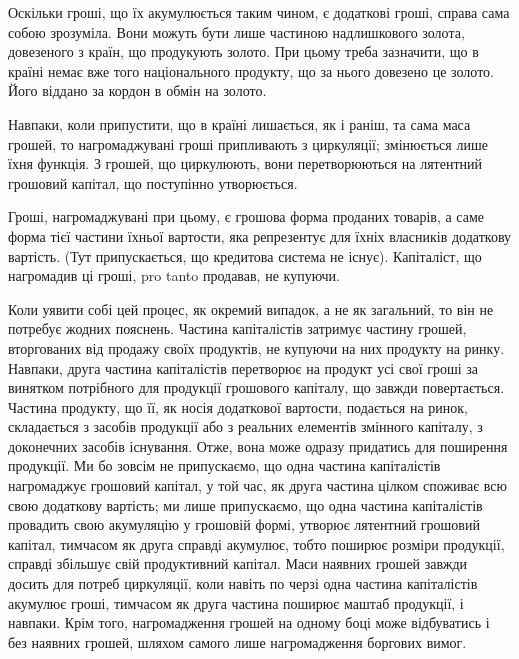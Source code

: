 Оскільки гроші, що їх акумулюється таким чином, є додаткові гроші,
справа сама собою зрозуміла. Вони можуть бути лише частиною надлишкового
золота, довезеного з країн, що продукують золото. При цьому
треба зазначити, що в країні немає вже того національного продукту,
що за нього довезено це золото. Його віддано за кордон в обмін на
золото.

Навпаки, коли припустити, що в країні лишається, як і раніш, та сама
маса грошей, то нагромаджувані гроші припливають з циркуляції; змінюється
лише їхня функція. З грошей, що циркулюють, вони перетворюються
на лятентний грошовий капітал, що поступінно утворюється.

Гроші, нагромаджувані при цьому, є грошова форма проданих товарів,
а саме форма тієї частини їхньої вартости, яка репрезентує для їхніх
власників додаткову вартість. (Тут припускається, що кредитова система
не існує). Капіталіст, що нагромадив ці гроші, pro tanto продавав, не
купуючи.

Коли уявити собі цей процес, як окремий випадок, а не як загальний,
то він не потребує жодних пояснень. Частина капіталістів затримує частину
грошей, вторгованих від продажу своїх продуктів, не купуючи на
них продукту на ринку. Навпаки, друга частина капіталістів перетворює
на продукт усі свої гроші за винятком потрібного для продукції грошового
капіталу, що завжди повертається. Частина продукту, що її, як носія
додаткової вартости, подається на ринок, складається з засобів продукції
або з реальних елементів змінного капіталу, з доконечних засобів існування.
Отже, вона може одразу придатись для поширення продукції.
Ми бо зовсім не припускаємо, що одна частина капіталістів нагромаджує
грошовий капітал, у той час, як друга частина цілком споживає всю свою
додаткову вартість; ми лише припускаємо, що одна частина капіталістів
провадить свою акумуляцію у грошовій формі, утворює лятентний грошовий
капітал, тимчасом як друга справді акумулює, тобто поширює розміри
продукції, справді збільшує свій продуктивний капітал. Маси наявних
грошей завжди досить для потреб циркуляції, коли навіть по черзі одна
частина капіталістів акумулює гроші, тимчасом як друга частина поширює
маштаб продукції, і навпаки. Крім того, нагромадження грошей на одному
боці може відбуватись і без наявних грошей, шляхом самого лише нагромадження
боргових вимог.

